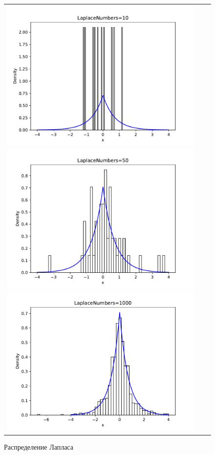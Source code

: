 \begin{figure}[H]
	\begin{tabular}{ccc}
		\includegraphics[scale=0.33]{laplace_hist_10.pdf}
		\includegraphics[scale=0.33]{laplace_hist_50.pdf}
		\includegraphics[scale=0.33]{laplace_hist_1000.pdf}
	\end{tabular}
	\caption{Распределение Лапласа}
\end{figure}

